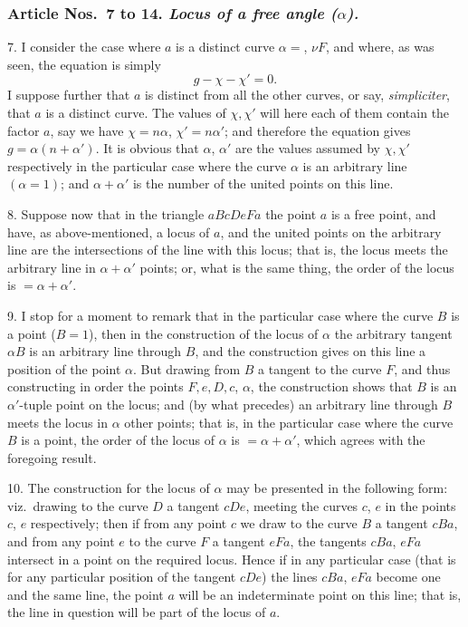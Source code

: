 \documentclass[11pt,a4paper]{book}
\begin{document}
\bigskip
\subsubsection*{Article Nos.\ 7 to 14.  \textit{Locus of a free angle ($\alpha$).}}

7. I consider the case where $a$ is a distinct curve $\alpha=$, $\nu F$, and where, as was
seen, the equation is simply
\[
g-\chi-\chi'=0.
\]
I suppose further that $a$ is distinct from all the other curves, or say, \textit{simpliciter}, that
$a$ is a distinct curve.  The values of $\chi, \chi'$ will here each of them contain the factor $a$,
say we have $\chi=n\alpha$, $\chi'=n\alpha'$; and therefore the equation gives $g=\alpha(n+\alpha')$.  It is
obvious that $\alpha$, $\alpha'$ are the values assumed by $\chi, \chi'$ respectively in the particular case
where the curve $\alpha$ is an arbitrary line $(\alpha=1)$; and $\alpha+\alpha'$ is the number of the
united points on this line.

8. Suppose now that in the triangle $aBcDeFa$ the point $a$ is a free point, and
have, as above-mentioned, a locus of $a$, and the united points on the arbitrary line
are the intersections of the line with this locus; that is, the locus meets the arbitrary
line in $\alpha+\alpha'$ points; or, what is the same thing, the order of the locus is $=\alpha+\alpha'$.

9. I stop for a moment to remark that in the particular case where the curve
$B$ is a point ($B=1$), then in the construction of the locus of $\alpha$ the arbitrary tangent
$\alpha B$ is an arbitrary line through $B$, and the construction gives on this line a position
of the point $\alpha$.  But drawing from $B$ a tangent to the curve $F$, and thus constructing
in order the points $F, e, D, c$, $\alpha$, the construction shows that $B$ is an $\alpha'$-tuple point
on the locus; and (by what precedes) an arbitrary line through $B$ meets the locus in
$\alpha$ other points; that is, in the particular case where the curve $B$ is a point, the
order of the locus of $\alpha$ is $= \alpha + \alpha'$, which agrees with the foregoing result.

10. The construction for the locus of $\alpha$ may be presented in the following form:
viz.\ drawing to the curve $D$ a tangent $cDe$, meeting the curves $c$, $e$ in the points
$c$, $e$ respectively; then if from any point $c$ we draw to the curve $B$ a tangent $cBa$,
and from any point $e$ to the curve $F$ a tangent $eFa$, the tangents $cBa$, $eFa$ intersect
in a point on the required locus.  Hence if in any particular case (that is for any
particular position of the tangent $cDe$) the lines $cBa$, $eFa$ become one and the same
line, the point $a$ will be an indeterminate point on this line; that is, the line in
question will be part of the locus of $a$.
\end{document}
